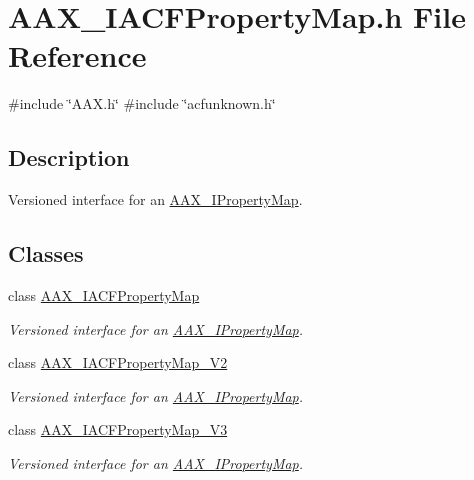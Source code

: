 \hypertarget{a00554}{}\section{A\+A\+X\+\_\+\+I\+A\+C\+F\+Property\+Map.\+h File Reference}
\label{a00554}
{\ttfamily \#include \char`\"{}A\+A\+X.\+h\char`\"{}}\newline
{\ttfamily \#include \char`\"{}acfunknown.\+h\char`\"{}}\newline


\subsection{Description}
Versioned interface for an \mbox{\hyperlink{a01869}{A\+A\+X\+\_\+\+I\+Property\+Map}}. 

\subsection*{Classes}
\begin{DoxyCompactItemize}
\item 
class \mbox{\hyperlink{a01745}{A\+A\+X\+\_\+\+I\+A\+C\+F\+Property\+Map}}
\begin{DoxyCompactList}\small\item\em Versioned interface for an \mbox{\hyperlink{a01869}{A\+A\+X\+\_\+\+I\+Property\+Map}}. \end{DoxyCompactList}\item 
class \mbox{\hyperlink{a01749}{A\+A\+X\+\_\+\+I\+A\+C\+F\+Property\+Map\+\_\+\+V2}}
\begin{DoxyCompactList}\small\item\em Versioned interface for an \mbox{\hyperlink{a01869}{A\+A\+X\+\_\+\+I\+Property\+Map}}. \end{DoxyCompactList}\item 
class \mbox{\hyperlink{a01753}{A\+A\+X\+\_\+\+I\+A\+C\+F\+Property\+Map\+\_\+\+V3}}
\begin{DoxyCompactList}\small\item\em Versioned interface for an \mbox{\hyperlink{a01869}{A\+A\+X\+\_\+\+I\+Property\+Map}}. \end{DoxyCompactList}\end{DoxyCompactItemize}

